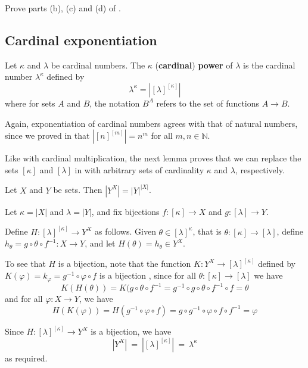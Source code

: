 \begin{exercise}
Prove parts (b), (c) and (d) of .
\end{exercise}

\subsection*{Cardinal exponentiation}

\begin{definition}
\label{defCardinalExponential}
Let $\kappa$ and $\lambda$ be cardinal numbers. The $\kappa$\supth{} (\textbf{cardinal}) \textbf{power} of $\lambda$ is the cardinal number $\lambda^{\kappa}$ defined by
\[ \lambda^{\kappa} = |[\lambda]^{[\kappa]}|\]
where for sets $A$ and $B$, the notation $B^A$ refers to the set of functions $A \to B$.
\end{definition}

Again, exponentiation of cardinal numbers agrees with that of natural numbers, since we proved in  that $|[n]^{[m]}| = n^m$ for all $m,n \in \mathbb{N}$.

Like with cardinal multiplication, the next lemma proves that we can replace the sets $[\kappa]$ and $[\lambda]$ in  with arbitrary sets of cardinality $\kappa$ and $\lambda$, respectively.

\begin{lemma}
\label{lemCardinalityOfFunctionSet}
Let $X$ and $Y$ be sets. Then $|Y^X| = |Y|^{|X|}$.
\end{lemma}

\begin{cproof}
Let $\kappa = |X|$ and $\lambda = |Y|$, and fix bijections $f : [\kappa] \to X$ and $g : [\lambda] \to Y$.

Define $H : [\lambda]^{[\kappa]} \to Y^X$ as follows. Given $\theta \in [\lambda]^{\kappa}$, that is $\theta : [\kappa] \to [\lambda]$, define $h_{\theta} = g \circ \theta \circ f^{-1} : X \to Y$, and let $H(\theta) = h_{\theta} \in Y^X$.

To see that $H$ is a bijection, note that the function $K : Y^X \to [\lambda]^{[\kappa]}$ defined by $K(\varphi) = k_{\varphi} = g^{-1} \circ \varphi \circ f$ is a bijection%
, since for all $\theta : [\kappa] \to [\lambda]$ we have
\[ K(H(\theta)) = K(g \circ \theta \circ f^{-1} = g^{-1} \circ g \circ \theta \circ f^{-1} \circ f = \theta \]
and for all $\varphi : X \to Y$, we have
\[ H(K(\varphi)) = H(g^{-1} \circ \varphi \circ f) = g \circ g^{-1} \circ \varphi \circ f \circ f^{-1} = \varphi \]

Since $H : [\lambda]^{[\kappa]} \to Y^X$ is a bijection, we have
\[ |Y^X| ~=~ |[\lambda]^{[\kappa]}| ~=~ \lambda^{\kappa}\]
as required.
\end{cproof}

